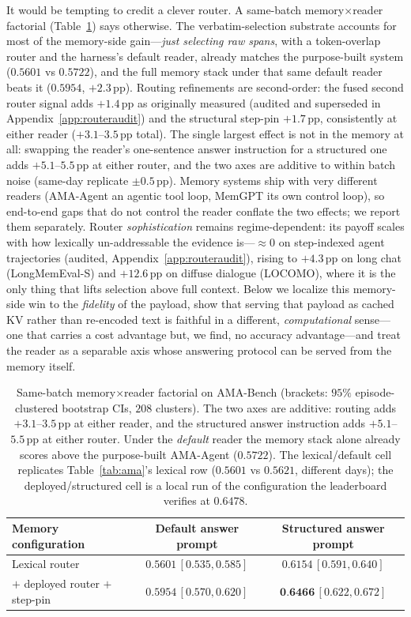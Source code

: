 \documentclass{article} %
\newcommand{\pp}{\,\mathrm{pp}}
\begin{document}
It would be tempting to credit a clever router. A same-batch
memory$\times$reader factorial (Table~\ref{tab:factorial}) says otherwise. The
verbatim-selection substrate accounts for most of the memory-side gain---\emph{just selecting raw spans}, with a
token-overlap router and the harness's default reader, already matches the
purpose-built system ($0.5601$ vs $0.5722$), and the full memory stack under that
same default reader beats it ($0.5954$, $+2.3\pp$). Routing refinements are
second-order: the fused second router signal adds $+1.4\pp$ as originally
measured (audited and superseded in Appendix~\ref{app:routeraudit}) and the structural step-pin
$+1.7\pp$, consistently at either reader ($+3.1$--$3.5\pp$ total). The
single largest effect is not in the memory at all: swapping the reader's
one-sentence answer instruction for a structured one adds $+5.1$--$5.5\pp$ at
either router, and the two axes are additive to within batch noise (same-day
replicate $\pm0.5\pp$). Memory systems ship with very different readers
(AMA-Agent an agentic tool loop, MemGPT its own control loop), so end-to-end gaps
that do not control the reader conflate the two effects; we report them
separately. Router \emph{sophistication} remains regime-dependent: its payoff scales with how
lexically un-addressable the evidence is---$\approx\!0$ on step-indexed agent
trajectories (audited, Appendix~\ref{app:routeraudit}), rising to $+4.3\pp$ on long
chat (LongMemEval-S) and $+12.6\pp$ on diffuse dialogue (LOCOMO), where it is the
only thing that lifts selection above full context. Below we localize this memory-side win to the \emph{fidelity} of the
payload, show that serving that payload as cached KV rather than re-encoded text
is faithful in a different, \emph{computational} sense---one that carries a cost
advantage but, we find, no accuracy advantage---and treat the reader as a separable axis
whose answering protocol can be served from the memory itself.

\begin{table}[t]
\centering
\caption{Same-batch memory$\times$reader factorial on AMA-Bench (brackets:
$95\%$ episode-clustered bootstrap CIs, $208$ clusters). The two axes are
additive: routing adds $+3.1$--$3.5\pp$ at either reader, and the structured answer
instruction adds $+5.1$--$5.5\pp$ at either router. Under the \emph{default} reader
the memory stack alone already scores above the purpose-built AMA-Agent ($0.5722$).
The lexical/default cell replicates Table~\ref{tab:ama}'s lexical row ($0.5601$ vs $0.5621$, different days);
the deployed/structured cell is a local run of the configuration the leaderboard verifies at $0.6478$.}
\label{tab:factorial}
\small
\begin{tabular}{lcc}
\toprule
Memory configuration & Default answer prompt & Structured answer prompt \\
\midrule
Lexical router & $0.5601\,[0.535,0.585]$ & $0.6154\,[0.591,0.640]$ \\
$+$ deployed router $+$ step-pin & $0.5954\,[0.570,0.620]$ & $\textbf{0.6466}\,[0.622,0.672]$ \\
\bottomrule
\end{tabular}
\end{table}
\end{document}
